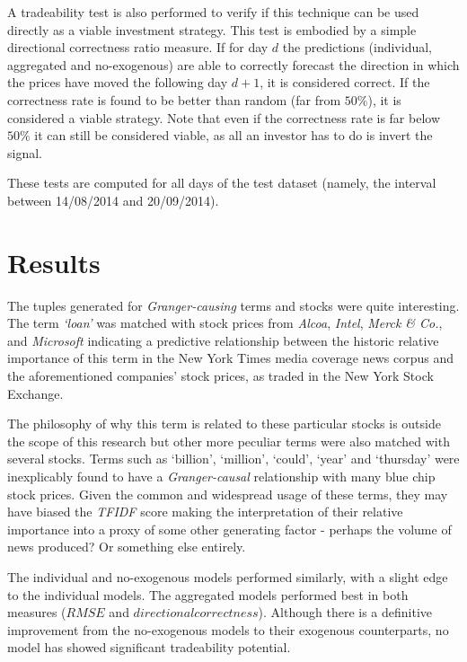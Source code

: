 \documentclass[conference,11pt]{IEEEtran}
\begin{document}
\par
A tradeability test is also performed to verify if this technique can be used directly as a viable investment strategy. This test is embodied by a simple directional correctness ratio measure. If for day \(d\) the predictions (individual, aggregated and no-exogenous) are able to correctly forecast the direction in which the prices have moved the following day \(d+1\), it is considered correct. If the correctness rate is found to be better than random (far from \(50\%\)), it is considered a viable strategy. Note that even if the correctness rate is far below \(50\%\) it can still be considered viable, as all an investor has to do is invert the signal.

\par
These tests are computed for all days of the test dataset (namely, the interval between 14/08/2014 and 20/09/2014).

\section{Results}
The tuples generated for \textit{Granger-causing} terms and stocks were quite interesting. The term \textit{`loan'} was matched with stock prices from \textit{Alcoa}, \textit{Intel}, \textit{Merck \& Co.}, and \textit{Microsoft} indicating a predictive relationship between the historic relative importance of this term in the New York Times media coverage news corpus and the aforementioned companies' stock prices, as traded in the New York Stock Exchange.

\par
The philosophy of why this term is related to these particular stocks is outside the scope of this research but other more peculiar terms were also matched with several stocks. Terms such as `billion', `million', `could', `year' and `thursday'  were inexplicably found to have a \textit{Granger-causal} relationship with many blue chip stock prices. Given the common and widespread usage of these terms, they may have biased the \textit{TFIDF} score making the interpretation of their relative importance into a proxy of some other generating factor - perhaps the volume of news produced? Or something else entirely.

\par
The individual and no-exogenous models performed similarly, with a slight edge to the individual models. The aggregated models performed best in both measures (\(RMSE\) and \(directional correctness\)). Although there is a definitive improvement from the no-exogenous models to their exogenous counterparts, no model has showed significant tradeability potential.
\end{document}
